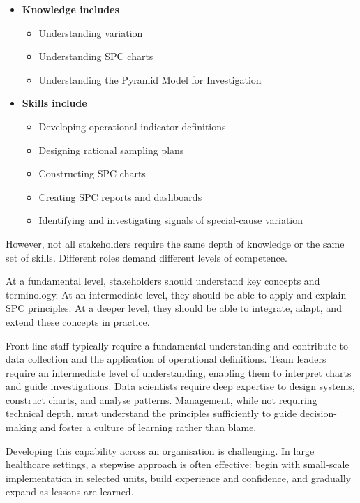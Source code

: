 \documentclass[
]{book}
\providecommand{\tightlist}{%
  \setlength{\itemsep}{0pt}\setlength{\parskip}{0pt}}
\begin{document}
\begin{itemize}
\tightlist
\item
  \textbf{Knowledge includes}

  \begin{itemize}
  \tightlist
  \item
    Understanding variation
  \item
    Understanding SPC charts
  \item
    Understanding the Pyramid Model for Investigation
  \end{itemize}
\item
  \textbf{Skills include}

  \begin{itemize}
  \tightlist
  \item
    Developing operational indicator definitions
  \item
    Designing rational sampling plans
  \item
    Constructing SPC charts
  \item
    Creating SPC reports and dashboards
  \item
    Identifying and investigating signals of special-cause variation
  \end{itemize}
\end{itemize}

However, not all stakeholders require the same depth of knowledge or the same set of skills. Different roles demand different levels of competence.

At a fundamental level, stakeholders should understand key concepts and terminology. At an intermediate level, they should be able to apply and explain SPC principles. At a deeper level, they should be able to integrate, adapt, and extend these concepts in practice.

Front-line staff typically require a fundamental understanding and contribute to data collection and the application of operational definitions. Team leaders require an intermediate level of understanding, enabling them to interpret charts and guide investigations. Data scientists require deep expertise to design systems, construct charts, and analyse patterns. Management, while not requiring technical depth, must understand the principles sufficiently to guide decision-making and foster a culture of learning rather than blame.

Developing this capability across an organisation is challenging. In large healthcare settings, a stepwise approach is often effective: begin with small-scale implementation in selected units, build experience and confidence, and gradually expand as lessons are learned.
\end{document}
